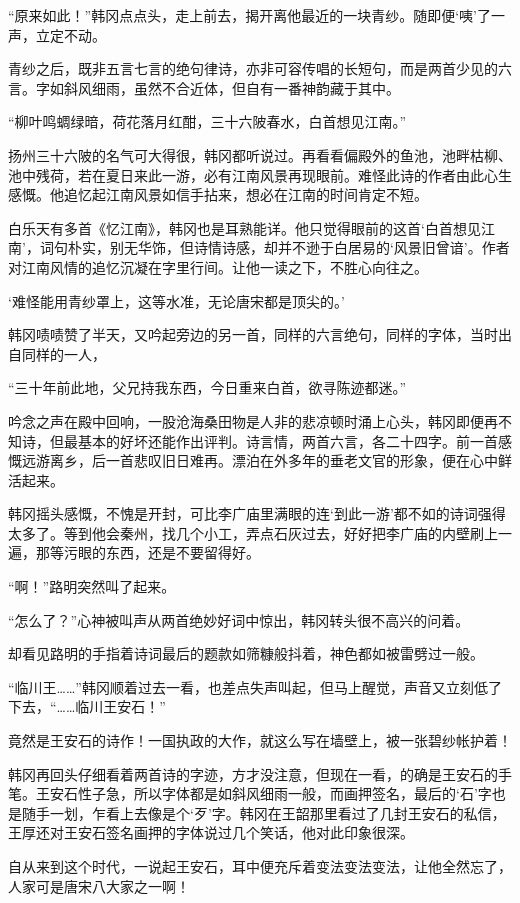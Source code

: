 “原来如此！”韩冈点点头，走上前去，揭开离他最近的一块青纱。随即便‘咦’了一声，立定不动。

青纱之后，既非五言七言的绝句律诗，亦非可容传唱的长短句，而是两首少见的六言。字如斜风细雨，虽然不合近体，但自有一番神韵藏于其中。

“柳叶鸣蜩绿暗，荷花落月红酣，三十六陂春水，白首想见江南。”

扬州三十六陂的名气可大得很，韩冈都听说过。再看看偏殿外的鱼池，池畔枯柳、池中残荷，若在夏日来此一游，必有江南风景再现眼前。难怪此诗的作者由此心生感慨。他追忆起江南风景如信手拈来，想必在江南的时间肯定不短。

白乐天有多首《忆江南》，韩冈也是耳熟能详。他只觉得眼前的这首‘白首想见江南’，词句朴实，别无华饰，但诗情诗感，却并不逊于白居易的‘风景旧曾谙’。作者对江南风情的追忆沉凝在字里行间。让他一读之下，不胜心向往之。

‘难怪能用青纱罩上，这等水准，无论唐宋都是顶尖的。’

韩冈啧啧赞了半天，又吟起旁边的另一首，同样的六言绝句，同样的字体，当时出自同样的一人，

“三十年前此地，父兄持我东西，今日重来白首，欲寻陈迹都迷。”

吟念之声在殿中回响，一股沧海桑田物是人非的悲凉顿时涌上心头，韩冈即便再不知诗，但最基本的好坏还能作出评判。诗言情，两首六言，各二十四字。前一首感慨远游离乡，后一首悲叹旧日难再。漂泊在外多年的垂老文官的形象，便在心中鲜活起来。

韩冈摇头感慨，不愧是开封，可比李广庙里满眼的连‘到此一游’都不如的诗词强得太多了。等到他会秦州，找几个小工，弄点石灰过去，好好把李广庙的内壁刷上一遍，那等污眼的东西，还是不要留得好。

“啊！”路明突然叫了起来。

“怎么了？”心神被叫声从两首绝妙好词中惊出，韩冈转头很不高兴的问着。

却看见路明的手指着诗词最后的题款如筛糠般抖着，神色都如被雷劈过一般。

“临川王……”韩冈顺着过去一看，也差点失声叫起，但马上醒觉，声音又立刻低了下去，“……临川王安石！”

竟然是王安石的诗作！一国执政的大作，就这么写在墙壁上，被一张碧纱帐护着！

韩冈再回头仔细看着两首诗的字迹，方才没注意，但现在一看，的确是王安石的手笔。王安石性子急，所以字体都是如斜风细雨一般，而画押签名，最后的‘石’字也是随手一划，乍看上去像是个‘歹’字。韩冈在王韶那里看过了几封王安石的私信，王厚还对王安石签名画押的字体说过几个笑话，他对此印象很深。

自从来到这个时代，一说起王安石，耳中便充斥着变法变法变法，让他全然忘了，人家可是唐宋八大家之一啊！


